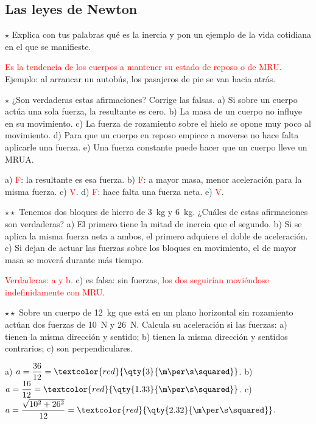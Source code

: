 \subsection{Las leyes de Newton}

\begin{exercise}
    \(\star\) Explica con tus palabras qué es la inercia y pon un ejemplo de la vida cotidiana en el que se manifieste.
    \begin{solu}
        \textcolor{red}{Es la tendencia de los cuerpos a mantener su estado de reposo o de MRU.} Ejemplo: al arrancar un autobús, los
        pasajeros de pie se van hacia atrás.
    \end{solu}
\end{exercise}

\begin{exercise}
    \(\star\) ¿Son verdaderas estas afirmaciones? Corrige las falsas. a) Si sobre un cuerpo actúa una sola fuerza, la resultante es
    cero. b) La masa de un cuerpo no influye en su movimiento. c) La fuerza de rozamiento sobre el hielo se opone muy poco al
    movimiento. d) Para que un cuerpo en reposo empiece a moverse no hace falta aplicarle una fuerza. e) Una fuerza constante puede
    hacer que un cuerpo lleve un MRUA.
    \begin{solu}
        a) \textcolor{red}{F}: la resultante es esa fuerza. b) \textcolor{red}{F}: a mayor masa, menor aceleración para la misma fuerza.
        c) \textcolor{red}{V}. d) \textcolor{red}{F}: hace falta una fuerza neta. e) \textcolor{red}{V}.
    \end{solu}
\end{exercise}

\begin{exercise}
    \(\star\star\) Tenemos dos bloques de hierro de \qty{3}{\kg} y \qty{6}{\kg}. ¿Cuáles de estas afirmaciones son verdaderas?
    a) El primero tiene la mitad de inercia que el segundo. b) Si se aplica la misma fuerza neta a ambos, el primero adquiere el doble
    de aceleración. c) Si dejan de actuar las fuerzas sobre los bloques en movimiento, el de mayor masa se moverá durante más tiempo.
    \begin{solu}
        \textcolor{red}{Verdaderas: a y b.} c) es falsa: sin fuerzas, \textcolor{red}{los dos seguirían moviéndose indefinidamente con
        MRU}.
    \end{solu}
\end{exercise}

\begin{exercise}
    \(\star\star\) Sobre un cuerpo de \qty{12}{\kg} que está en un plano horizontal sin rozamiento actúan dos fuerzas de
    \qty{10}{\newton} y \qty{26}{\newton}. Calcula su aceleración si las fuerzas: a) tienen la misma dirección y sentido; b) tienen
    la misma dirección y sentidos contrarios; c) son perpendiculares.
    \begin{solu}
        a) \(a = \dfrac{36}{12} = \textcolor{red}{\qty{3}{\m\per\s\squared}}\). b) \(a = \dfrac{16}{12} = \textcolor{red}{\qty{1.33}{\m\per\s\squared}}\).
        c) \(a = \dfrac{\sqrt{10^2 + 26^2}}{12} = \textcolor{red}{\qty{2.32}{\m\per\s\squared}}\).
    \end{solu}
\end{exercise}


